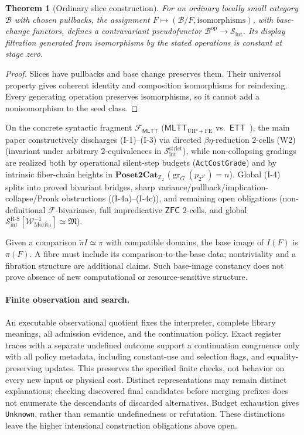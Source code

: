 \documentclass[11pt]{article}
\theoremstyle{plain}
\newtheorem{theorem}{Theorem}[section]
\theoremstyle{definition}
\newcommand{\RS}{\mathrm{R\text{-}S}}
\newcommand{\cS}{\mathcal{S}}
\newcommand{\cF}{\mathcal{F}}
\newcommand{\fM}{\mathfrak{M}}
\newcommand{\Sint}{\cS_{\mathrm{int}}}
\newcommand{\ZFC}{\mathsf{ZFC}}
\newcommand{\MLTT}{\mathsf{MLTT}}
\newcommand{\ETT}{\mathsf{ETT}}
\begin{document}
\begin{theorem}[Ordinary slice construction]\label{thm:intensional}
For an ordinary locally small category $\mathcal B$ with chosen pullbacks, the assignment $F\mapsto(\mathcal B/F,\text{isomorphisms})$, with base-change functors, defines a contravariant pseudofunctor $\mathcal B^{\mathrm{op}}\to\Sint$. Its display filtration generated from isomorphisms by the stated operations is constant at stage zero.
\end{theorem}
\begin{proof}
Slices have pullbacks and base change preserves them. Their universal property gives coherent identity and composition isomorphisms for reindexing. Every generating operation preserves isomorphisms, so it cannot add a nonisomorphism to the seed class.
\end{proof}
On the concrete syntactic fragment $\mathcal{F}_{\MLTT}$ ($\MLTT_{\mathrm{UIP}+\mathrm{FE}}$ vs.\ $\ETT$~\cite{KapulkinLi2025}), the main paper constructively discharges \textup{(I-1)--(I-3)} via directed $\beta\eta$-reduction $2$-cells \textup{(W2)} (invariant under arbitrary $2$-equivalences in $\mathcal{S}_{\mathrm{int}}^{\mathrm{strict}}$), while non-collapsing gradings are realized both by operational silent-step budgets (\texttt{ActCostGrade}) and by intrinsic fiber-chain heights in $\mathbf{Poset2Cat}_{\mathbb{Z}_2}$ ($\operatorname{gr}_G(p_{2^{2^n}}) = n$). Global \textup{(I-4)} splits into proved bivariant bridges, sharp variance/pullback/implication-collapse/Pronk obstructions (\textup{(I-4a)--(I-4c)}), and remaining open obligations (non-definitional $\cF$-bivariance, full impredicative $\ZFC$ $2$-cells, and global $\Sint^{\RS}[\mathcal{W}_{\mathrm{Morita}}^{-1}] \simeq \fM$).

Given a comparison $\widetilde\pi I\simeq\pi$ with compatible domains, the base image of $I(F)$ is $\pi(F)$. A fibre must include its comparison-to-the-base data; nontriviality and a fibration structure are additional claims. Such base-image constancy does not prove absence of new computational or resource-sensitive structure.

\paragraph{Finite observation and search.}
An executable observational quotient fixes the interpreter, complete library
meanings, all admission evidence, and the continuation policy. Exact register
traces with a separate undefined outcome support a continuation congruence
only with all policy metadata, including constant-use and selection flags,
and equality-preserving updates. This preserves the specified finite checks,
not behavior on every new input or physical cost. Distinct representations
may remain distinct explanations; checking discovered final candidates before
merging prefixes does not enumerate the descendants of discarded alternatives.
Budget exhaustion gives \texttt{Unknown}, rather than semantic undefinedness
or refutation. These distinctions leave the higher intensional construction
obligations above open.
\end{document}
